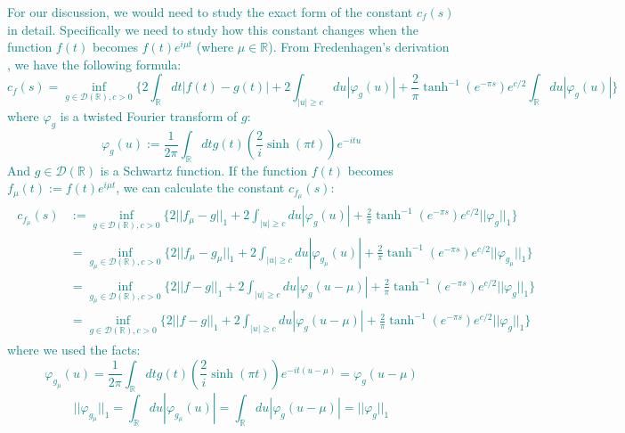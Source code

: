 \documentclass[a4paper,11pt]{article}
\theoremstyle{definition}
\newcommand{\lb}{\left(}
\newcommand{\rb}{\right)}
\newcommand{\YC}[1]{\textcolor{teal}{#1}}
\begin{document}
\YC{
For our discussion, we would need to study the exact form of the constant $c_f(s)$ in detail. Specifically we need to study how this constant changes when the function $f(t)$ becomes $f(t)e^{i\mu t}$ (where $\mu\in\mathbb{R}$). From Fredenhagen's derivation \cite{fredenhagen}, we have the following formula:
\begin{equation}
    c_f(s) = \inf_{g\in \mathcal{D}(\mathbb{R}), c > 0}\{2\int_\mathbb{R} dt|f(t) - g(t)| + 2\int_{|u| \geq c}du |\varphi_g(u)| + \frac{2}{\pi}\tanh^{-1}(e^{-\pi s})e^{c/2}\int_\mathbb{R} du|\varphi_g(u)|\}
\end{equation}
where $\varphi_g$ is a twisted Fourier transform of $g$:
\begin{equation}
    \varphi_g(u) := \frac{1}{2\pi}\int_\mathbb{R} dt g(t)\lb\frac{2}{i}\sinh(\pi t)\rb e^{-itu}
\end{equation}
And $g\in\mathcal{D}(\mathbb{R})$ is a Schwartz function.
}
\YC{
If the function $f(t)$ becomes $f_\mu(t) := f(t)e^{i\mu t}$, we can calculate the constant $c_{f_\mu}(s)$:
\begin{align}
    \begin{split}
        c_{f_\mu}(s) &:= \inf_{g\in\mathcal{D}(\mathbb{R}),c>0}\{2||f_\mu-g||_1 + 2\int_{|u|\geq c}du|\varphi_g(u)| + \frac{2}{\pi}\tanh^{-1}(e^{-\pi s})e^{c/2}||\varphi_g||_1\}
        \\&
        =\inf_{g_\mu\in\mathcal{D}(\mathbb{R}),c>0}\{2||f_\mu-g_\mu||_1 + 2\int_{|u|\geq c}du |\varphi_{g_\mu}(u)| + \frac{2}{\pi}\tanh^{-1}(e^{-\pi s})e^{c/2}||\varphi_{g_\mu}||_1\}
        \\&
        =\inf_{g_\mu\in\mathcal{D}(\mathbb{R}),c>0}\{2||f-g||_1 + 2\int_{|u|\geq c}du|\varphi_g(u - \mu)| + \frac{2}{\pi}\tanh^{-1}(e^{-\pi s})e^{c/2}||\varphi_g||_1\}
        \\&
        =\inf_{g\in\mathcal{D}(\mathbb{R}),c>0}\{2||f-g||_1 + 2\int_{|u|\geq c}du|\varphi_g(u - \mu)|+ \frac{2}{\pi}\tanh^{-1}(e^{-\pi s})e^{c/2}||\varphi_g||_1\}
    \end{split}
\end{align}
where we used the facts:
\begin{equation}
    \varphi_{g_\mu}(u) = \frac{1}{2\pi}\int_\mathbb{R}dt g(t)\lb\frac{2}{i}\sinh(\pi t)\rb e^{-it(u - \mu)} = \varphi_g(u - \mu)
\end{equation}
\begin{equation}
    ||\varphi_{g_\mu}||_1 = \int_\mathbb{R} du |\varphi_{g_\mu}(u)| = \int_\mathbb{R} du |\varphi_g(u - \mu)|=||\varphi_g||_1
\end{equation}
}
\end{document}
